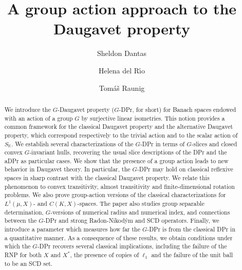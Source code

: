 \documentclass[a4paper,12pt]{amsart}
\theoremstyle{definition}
\theoremstyle{definition}
\theoremstyle{remark}
\numberwithin{equation}{section}
\newcommand{\K}{\mathbb{K}}
\newcommand{\<}{\langle}
\renewcommand{\>}{\rangle}
\begin{document}
	
	
	\title[A group action approach to the Daugavet property]{A group action approach to the Daugavet property}
	
	\author[S.~Dantas]{Sheldon Dantas}
	\address[S.~Dantas]{Czech Technical University in Prague, FEE, Department of Mathematics, Technická 2, 16627, Prague 6, Czech Republic \newline
		\href{https://orcid.org/0000-0001-8117-3760}{ORCID: \texttt{0000-0001-8117-3760}}}
	
	\author[H.~Del R\'{\i}o]{Helena del R\'{\i}o} 
	\address[H.~Del R\'{i}o]{Department of Mathematical Analysis and Institute of Mathematics (IMAG), University of Granada, E-18071 Granada, Spain \newline
		\href{https://orcid.org/0009-0004-5078-6993}{ORCID: \texttt{0009-0004-5078-6993} }}
	
	\author[T.~Raunig]{Tomáš Raunig}
	\address[T.~Raunig]{Institute of Mathematics, Czech Academy of Sciences, Žitná 25, 115 67, Czech Republic\newline second address: Faculty of Mathematics and Physics, Charles University, Sokolovská 83, Prague, 186 00 \newline
		\href{https://orcid.org/0009-0001-3425-8726}{ORCID: \texttt{0009-0001-3425-8726}}}
	
	
	
	\begin{abstract} We introduce the $G$-Daugavet property ($G$-DPr, for short) for Banach spaces endowed with an action of a group $G$ by surjective linear isometries. This notion provides a common framework for the classical Daugavet property and the alternative Daugavet property, which correspond respectively to the trivial action and to the scalar action of $S_{\K}$. We establish several characterizations of the $G$-DPr in terms of $G$-slices and closed convex $G$-invariant hulls, recovering the usual slice descriptions of the DPr and the aDPr as particular cases. We show that the presence of a group action leads to new behavior in Daugavet theory. In particular, the $G$-DPr may hold on classical reflexive spaces in sharp contrast with the classical Daugavet property. We relate this phenomenon to convex transitivity, almost transitivity and finite-dimensional rotation problems. We also prove group-action versions of the classical characterizations for $L^1(\mu, X)$- and $C(K,X)$-spaces. The paper also studies group separable determination, $G$-versions of numerical radius and numerical index, and connections between the $G$-DPr and strong Radon-Nikodým and SCD operators.
		Finally, we introduce a parameter which measures how far the $G$-DPr is from the classical DPr in a quantitative manner. As a consequence of these results, we obtain conditions under which the $G$-DPr recovers several classical implications, including the failure of the RNP for both $X$ and $X^*$, the presence of copies of $\ell_1$ and the failure of the unit ball to be an SCD set. 
	\end{abstract}
	
\end{document}
